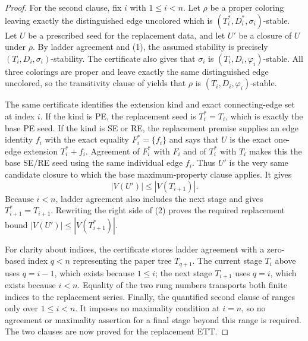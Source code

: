 \begin{proof}
For the second clause, fix \(i\) with \(1\leq i<n\).  Let \(\rho\) be a
proper coloring leaving exactly the distinguished edge uncolored which is
\((T_i^*,D_i^*,\sigma_i)\)-stable.  Let \(U\) be a prescribed seed for
the replacement data, and let \(U'\) be a closure of \(U\) under
\(\rho\).  By ladder agreement and (1), the assumed stability is precisely
\((T_i,D_i,\sigma_i)\)-stability.  The certificate also gives that
\(\sigma_i\) is \((T_i,D_i,\varphi_i)\)-stable.  All three colorings are
proper and leave exactly the same distinguished edge uncolored, so the
transitivity clause of  yields that \(\rho\) is
\((T_i,D_i,\varphi_i)\)-stable.

The same certificate identifies the extension kind and exact
connecting-edge set at index \(i\).  If the kind is PE, the replacement
seed is \(T_i^*=T_i\), which is exactly the base PE seed.  If the kind is
SE or RE, the replacement premise supplies an edge identity \(f_i\) with
the exact equality \(F_i^*=\{f_i\}\) and says that \(U\) is the exact
one-edge extension \(T_i^*+f_i\).  Agreement of \(F_i^*\) with \(F_i\)
and of \(T_i^*\) with \(T_i\) makes this the base SE/RE seed using the
same individual edge \(f_i\).  Thus \(U'\) is the very same candidate
closure to which the base maximum-property clause applies.  It gives
\[
                         |V(U')|\leq |V(T_{i+1})|.  \tag{2}
\]
Because \(i<n\), ladder agreement also includes the next stage and gives
\(T_{i+1}^*=T_{i+1}\).  Rewriting the right side of (2) proves the required
replacement bound
\(|V(U')|\leq |V(T_{i+1}^*)|\).

For clarity about indices, the certificate stores ladder agreement with a
zero-based index \(q<n\) representing the paper tree \(T_{q+1}\).  The
current stage \(T_i\) above uses \(q=i-1\), which exists because
\(1\leq i\); the next stage \(T_{i+1}\) uses \(q=i\), which exists because
\(i<n\).  Equality of the two rung numbers transports both finite indices
to the replacement series.  Finally, the quantified second clause of
 ranges only over \(1\leq i<n\).  It imposes no
maximality condition at \(i=n\), so no agreement or maximality assertion
for a final stage beyond this range is required.  The two clauses are now
proved for the replacement ETT.
\end{proof}
